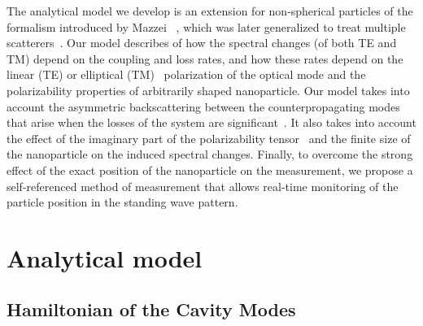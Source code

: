 \documentclass[journal=jacsat,manuscript=article]{achemso}
\begin{document}
The analytical model we develop is an extension for non-spherical particles of the formalism introduced by Mazzei ~\cite{mazzei2007}, which was later generalized to treat multiple scatterers~\cite{yi2011multiple}. Our model describes of how the spectral changes (of both TE and TM) depend on the coupling and loss rates, and how these rates depend on the linear (TE) or elliptical (TM)~\cite{junge2013strong,axelrod1984total,kawalec2007spectroscopic} polarization of the optical mode and the polarizability properties of arbitrarily shaped nanoparticle. Our model takes into account the asymmetric backscattering between the counterpropagating modes that arise when the losses of the system are significant~\cite{wiersig2011structure,peng2016chiral,zhu2010contorolled}. It also takes into account the effect of the imaginary part of the polarizability tensor~\cite{hu2014mode} and the finite size of the nanoparticle on the induced spectral changes. Finally, to overcome the strong effect of the exact position of the nanoparticle on the measurement, we propose a self-referenced method of measurement that allows real-time monitoring of the particle position in the standing wave pattern.

\section{Analytical model}

\subsection{Hamiltonian of the Cavity Modes}
\end{document}
